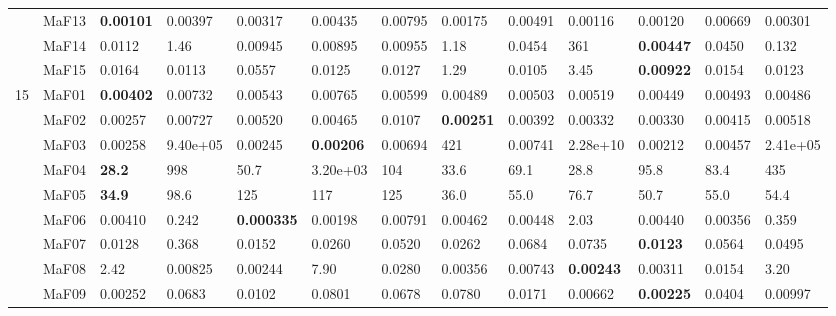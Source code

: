 \documentclass[]{article}
\begin{document}
\begin{landscape}
\begin{table}
\begin{footnotesize}
\begin{tabular}{|l|l|l|l|l|l|l|l|l|l|l|l|l|}
 & MaF13 & \cellcolor{gray95} {\bf 0.00101} & 0.00397 & 0.00317 & 0.00435 & 0.00795 & \cellcolor{gray95} 0.00175 & 0.00491 & \cellcolor{gray95} 0.00116 & \cellcolor{gray95} 0.00120 & 0.00669 & 0.00301\\
 & MaF14 & 0.0112 & 1.46 & 0.00945 & \cellcolor{gray95} 0.00895 & 0.00955 & 1.18 & 0.0454 & 361 & \cellcolor{gray95} {\bf 0.00447} & 0.0450 & 0.132\\
 & MaF15 & 0.0164 & \cellcolor{gray95} 0.0113 & 0.0557 & 0.0125 & 0.0127 & 1.29 & \cellcolor{gray95} 0.0105 & 3.45 & \cellcolor{gray95} {\bf 0.00922} & 0.0154 & \cellcolor{gray95} 0.0123\\
\hline

\multirow{15}{*}{15} & MaF01 & \cellcolor{gray95} {\bf 0.00402} & 0.00732 & 0.00543 & 0.00765 & 0.00599 & \cellcolor{gray95} 0.00489 & 0.00503 & 0.00519 & \cellcolor{gray95} 0.00449 & 0.00493 & 0.00486\\
 & MaF02 & \cellcolor{gray95} 0.00257 & 0.00727 & 0.00520 & 0.00465 & 0.0107 & \cellcolor{gray95} {\bf 0.00251} & 0.00392 & \cellcolor{gray95} 0.00332 & \cellcolor{gray95} 0.00330 & 0.00415 & 0.00518\\
 & MaF03 & 0.00258 & 9.40e+05 & \cellcolor{gray95} 0.00245 & \cellcolor{gray95} {\bf 0.00206} & 0.00694 & 421 & 0.00741 & 2.28e+10 & \cellcolor{gray95} 0.00212 & 0.00457 & 2.41e+05\\
 & MaF04 & \cellcolor{gray95} {\bf 28.2} & 998 & \cellcolor{gray95} 50.7 & 3.20e+03 & 104 & \cellcolor{gray95} 33.6 & 69.1 & \cellcolor{gray95} 28.8 & 95.8 & 83.4 & 435\\
 & MaF05 & \cellcolor{gray95} {\bf 34.9} & 98.6 & 125 & 117 & 125 & \cellcolor{gray95} 36.0 & \cellcolor{gray95} 55.0 & 76.7 & \cellcolor{gray95} 50.7 & \cellcolor{gray95} 55.0 & \cellcolor{gray95} 54.4\\
 & MaF06 & 0.00410 & 0.242 & \cellcolor{gray95} {\bf 0.000335} & \cellcolor{gray95} 0.00198 & 0.00791 & 0.00462 & 0.00448 & 2.03 & 0.00440 & \cellcolor{gray95} 0.00356 & 0.359\\
 & MaF07 & \cellcolor{gray95} 0.0128 & 0.368 & \cellcolor{gray95} 0.0152 & 0.0260 & 0.0520 & 0.0262 & 0.0684 & 0.0735 & \cellcolor{gray95} {\bf 0.0123} & 0.0564 & 0.0495\\
 & MaF08 & \cellcolor{gray95} 2.42 & 0.00825 & \cellcolor{gray95} 0.00244 & 7.90 & 0.0280 & \cellcolor{gray95} 0.00356 & 0.00743 & \cellcolor{gray95} {\bf 0.00243} & \cellcolor{gray95} 0.00311 & 0.0154 & 3.20\\
 & MaF09 & \cellcolor{gray95} 0.00252 & 0.0683 & 0.0102 & 0.0801 & 0.0678 & 0.0780 & 0.0171 & \cellcolor{gray95} 0.00662 & \cellcolor{gray95} {\bf 0.00225} & 0.0404 & 0.00997\\

\end{tabular}
\end{footnotesize}
\end{table}
\end{landscape}
\end{document}
